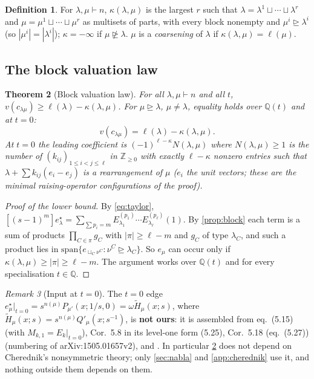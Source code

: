 \documentclass[11pt]{amsart}
\newtheorem{theorem}{Theorem}[section]
\theoremstyle{definition}
\newtheorem{definition}[theorem]{Definition}
\theoremstyle{remark}
\newtheorem{remark}[theorem]{Remark}
\numberwithin{equation}{section}
\newcommand{\val}{v}
\begin{document}
\begin{definition}
For $\lambda,\mu\vdash n$, $\kappa(\lambda,\mu)$ is the largest $r$ such that $\lambda=\lambda^1\sqcup\cdots\sqcup\lambda^r$ and $\mu=\mu^1\sqcup\cdots\sqcup\mu^r$ as multisets of parts, with every block nonempty and $\mu^i\trianglerighteq\lambda^i$ (so $|\mu^i|=|\lambda^i|$); $\kappa=-\infty$ if $\mu\not\trianglerighteq\lambda$. $\mu$ is a \emph{coarsening} of $\lambda$ if $\kappa(\lambda,\mu)=\ell(\mu)$.
\end{definition}

\subsection{The block valuation law}
\begin{theorem}[Block valuation law]\label{thm:blocklaw}
For all $\lambda,\mu\vdash n$ and all $t$, $\val(c_{\lambda\mu})\ge\ell(\lambda)-\kappa(\lambda,\mu)$. For $\mu\trianglerighteq\lambda$, $\mu\neq\lambda$, equality holds over $\mathbb{Q}(t)$ and at $t=0$:
\[ \val(c_{\lambda\mu})=\ell(\lambda)-\kappa(\lambda,\mu). \]
At $t=0$ the leading coefficient is $(-1)^{\ell-\kappa}N(\lambda,\mu)$ where $N(\lambda,\mu)\ge1$ is the number of $(k_{ij})_{1\le i<j\le\ell}$ in $\mathbb{Z}_{\ge0}$ with exactly $\ell-\kappa$ nonzero entries such that $\lambda+\sum k_{ij}(e_i-e_j)$ is a rearrangement of $\mu$ ($e_i$ the unit vectors; these are the minimal raising-operator configurations of the proof).
\end{theorem}

\begin{proof}[Proof of the lower bound]
By \eqref{eq:taylor}, $[(s-1)^m]e^\star_\lambda=\sum_{\sum p_i=m}E^{(p_1)}_{\lambda_1}\cdots E^{(p_\ell)}_{\lambda_\ell}(1)$. By \cref{prop:block} each term is a sum of products $\prod_{C\in\pi}g_C$ with $|\pi|\ge\ell-m$ and $g_C$ of type $\lambda_C$, and such a product lies in $\mathrm{span}\{e_{\sqcup_C\nu^C}:\nu^C\trianglerighteq\lambda_C\}$. So $e_\mu$ can occur only if $\kappa(\lambda,\mu)\ge|\pi|\ge\ell-m$. The argument works over $\mathbb{Q}(t)$ and for every specialisation $t\in\mathbb{Q}$.
\end{proof}

\begin{remark}[Input at $t=0$]\label{rem:t0input}
The $t=0$ edge $e^\star_\mu|_{t=0}=s^{n(\mu)}P_{\mu'}(x;1/s,0)=\omega\widetilde H_\mu(x;s)$, where $\widetilde H_\mu(x;s)=s^{n(\mu)}Q'_\mu(x;s^{-1})$, is \textbf{not ours}: it is assembled from \cite{DFK18} eq.~(5.15) (with $M_{k,1}=E_k|_{t=0}$), Cor.~5.8 in its level-one form (5.25), Cor.~5.18 (eq.~(5.27)) (numbering of arXiv:1505.01657v2), and \cite[VI (5.1), (4.14)(iv)]{Macdonald95}. In particular \cref{thm:blocklaw} does not depend on Cherednik's nonsymmetric theory; only \cref{sec:nabla} and \cref{app:cherednik} use it, and nothing outside them depends on them.
\end{remark}
\end{document}
